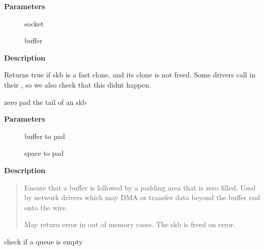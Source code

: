 \documentclass[a4paper,8pt,english]{sphinxmanual}
\begin{document}
\textbf{Parameters}
\begin{description}
\item[{}] \leavevmode
socket

\item[{}] \leavevmode
buffer

\end{description}

\textbf{Description}

Returns true if skb is a fast clone, and its clone is not freed.
Some drivers call {\hyperref[networking/kapi:c.skb_orphan]{\emph{}}} in their ,
so we also check that this didnt happen.

\begin{fulllineitems}
\label{networking/kapi:c.skb_pad}
zero pad the tail of an skb

\end{fulllineitems}


\textbf{Parameters}
\begin{description}
\item[{}] \leavevmode
buffer to pad

\item[{}] \leavevmode
space to pad

\end{description}

\textbf{Description}
\begin{quote}

Ensure that a buffer is followed by a padding area that is zero
filled. Used by network drivers which may DMA or transfer data
beyond the buffer end onto the wire.

May return error in out of memory cases. The skb is freed on error.
\end{quote}

\begin{fulllineitems}
\label{networking/kapi:c.skb_queue_empty}
check if a queue is empty

\end{fulllineitems}
\end{document}
